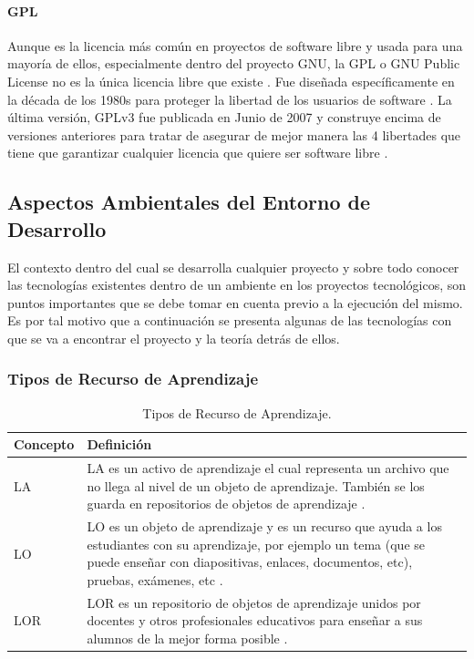 \paragraph{GPL}
Aunque es la licencia más común en proyectos de software libre y usada para una mayoría de ellos, especialmente dentro del proyecto GNU, la GPL o GNU Public License no es la única licencia libre que existe \citep{GNU-Licenses}. Fue diseñada específicamente en la década de los 1980s para proteger la libertad de los usuarios de software \citep{GNU-Open-vs-Free}. La última versión, GPLv3 fue publicada en Junio de 2007 y construye encima de versiones anteriores para tratar de asegurar de mejor manera las 4 libertades que tiene que garantizar cualquier licencia que quiere ser software libre \citep{GNU-GPL-Guide} \citep{GNU-GPL}.

\subsection{Aspectos Ambientales del Entorno de Desarrollo}
El contexto dentro del cual se desarrolla cualquier proyecto y sobre todo conocer las tecnologías existentes dentro de un ambiente en los proyectos tecnológicos, son puntos importantes que se debe tomar en cuenta previo a la ejecución del mismo. Es por tal motivo que a continuación se presenta algunas de las tecnologías con que se va a encontrar el proyecto y la teoría detrás de ellos.

\subsubsection{Tipos de Recurso de Aprendizaje}
\begin{table}[h!]
	\small
    \begin{tabular}{|p{}|p{}|}
        \hline
        Concepto & Definición \\
        \hline
        LA & LA es un activo de aprendizaje el cual representa un archivo que no llega al nivel de un objeto de aprendizaje. También se los guarda en repositorios de objetos de aprendizaje \citep{GOVIEW-LOR}. \\
        \hline
        LO & LO es un objeto de aprendizaje y es un recurso que ayuda a los estudiantes con su aprendizaje, por ejemplo un tema (que se puede enseñar con diapositivas, enlaces, documentos, etc), pruebas, exámenes, etc \citep{GOVIEW-LOR}. \\
        \hline
        LOR & LOR es un repositorio de objetos de aprendizaje unidos por docentes y otros profesionales educativos para enseñar a sus alumnos de la mejor forma posible \citep{GOVIEW-LOR}. \\
        \hline
    \end{tabular}
	\caption{Tipos de Recurso de Aprendizaje.}
    \label{tipos-recurso-aprendizaje}
\end{table}

